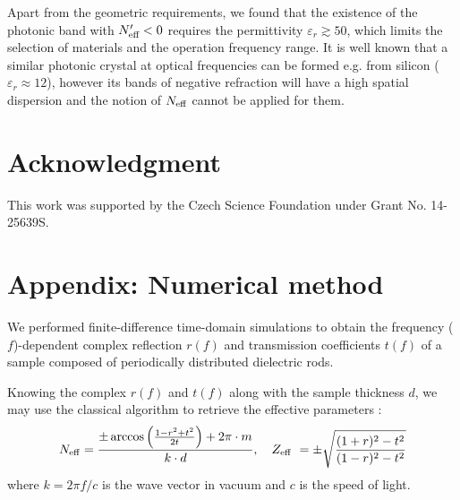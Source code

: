 \documentclass[letterpaper,12pt]{report}
\begin{document}
Apart from the geometric requirements, we found that the existence of the photonic band
with $N_{\text{eff} }'<0$ requires the permittivity $\varepsilon_r \gtrsim 50$, which limits the
selection of materials and the operation frequency range. It is well known that a similar
photonic crystal at optical frequencies can be formed e.g. from silicon ($\varepsilon_r
\approx 12$), however its bands of negative refraction will have a high spatial
dispersion and the notion of $N_{\text{eff} }$ cannot be applied for them.

\section{Acknowledgment}
\noindent This work was supported by the Czech Science Foundation under Grant No. 14-25639S.


 


\section{Appendix: Numerical method}
We performed finite-difference time-domain simulations \cite{oskooi2010meep} to obtain
the frequency ($f$)-dependent complex reflection $r(f)$ and transmission coefficients
$t(f)$ of a sample composed of periodically distributed dielectric rods.

Knowing the complex $r(f)$ and $t(f)$ along with the sample thickness $d$, we may use the
classical algorithm to retrieve the effective parameters \cite{smith2002determination}:
\begin{equation}
N_{\rm eff} = \frac{\pm \arccos\left(\frac{1 - r^2+t^2}{2 t}\right) + 2\pi \cdot m}{k
\cdot d}, \quad Z_{\rm eff}~= \pm \sqrt{\frac{(1+r)^2 - t^2}{(1-r)^2 - t^2}} \label{eq_Z}
\end{equation}
where $k = 2\pi f/c$ is the wave vector in vacuum and $c$ is the speed of light.
\end{document}
